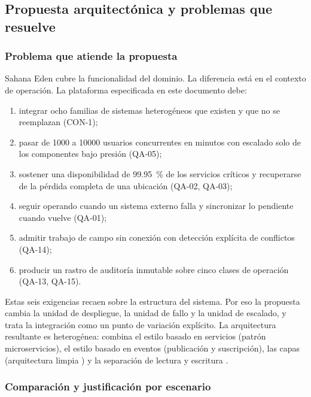 \documentclass[11pt,letterpaper]{article}
\begin{document}
\subsection{Propuesta arquitectónica y problemas que resuelve}
\label{sec:propuesta}

\subsubsection{Problema que atiende la propuesta}

Sahana Eden cubre la funcionalidad del dominio. La diferencia está en el contexto de operación. La
plataforma especificada en este documento debe:

\begin{enumerate}
  \item integrar ocho familias de sistemas heterogéneos que existen y que no se reemplazan (CON-1);
  \item pasar de \num{1000} a \num{10000} usuarios concurrentes en minutos con escalado solo de los
        componentes bajo presión (QA-05);
  \item sostener una disponibilidad de \qty{99.95}{\percent} de los servicios críticos y recuperarse
        de la pérdida completa de una ubicación (QA-02, QA-03);
  \item seguir operando cuando un sistema externo falla y sincronizar lo pendiente cuando vuelve
        (QA-01);
  \item admitir trabajo de campo sin conexión con detección explícita de conflictos (QA-14);
  \item producir un rastro de auditoría inmutable sobre cinco clases de operación (QA-13, QA-15).
\end{enumerate}

Estas seis exigencias recaen sobre la estructura del sistema. Por eso la propuesta cambia la unidad
de despliegue, la unidad de fallo y la unidad de escalado, y trata la integración como un punto de
variación explícito. La arquitectura resultante es heterogénea: combina el estilo basado en servicios
(patrón microservicios), el estilo basado en eventos (publicación y suscripción), las capas
(arquitectura limpia \cite{martin}) y la separación de lectura y escritura \cite{sad}.

\subsubsection{Comparación y justificación por escenario}
\end{document}
